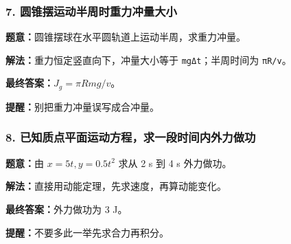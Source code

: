 \documentclass[12pt,a4paper]{ctexart}
\begin{document}
\subsubsection*{7. 圆锥摆运动半周时重力冲量大小}
\begin{tcolorbox}[colback=gray!2!white,colframe=black!60,title={题目}]
\textbf{题意：}圆锥摆球在水平圆轨道上运动半周，求重力冲量。\par
\end{tcolorbox}
\begin{tcolorbox}[colback=blue!2!white,colframe=blue!55!black,title={完整答案}]
\textbf{解法：}重力恒定竖直向下，冲量大小等于 \texttt{mgΔt}；半周时间为 \texttt{πR/v}。\par
\textbf{最终答案：}\(J_g=πRmg/v\)。\par

\end{tcolorbox}
\begin{tcolorbox}[colback=red!2!white,colframe=red!55!black,title={易错点}]
\textbf{提醒：}别把重力冲量误写成合冲量。\par
\end{tcolorbox}

\subsubsection*{8. 已知质点平面运动方程，求一段时间内外力做功}
\begin{tcolorbox}[colback=gray!2!white,colframe=black!60,title={题目}]
\textbf{题意：}由 \(x=5t, y=0.5t^2\) 求从 2 s 到 4 s 外力做功。\par
\end{tcolorbox}
\begin{tcolorbox}[colback=blue!2!white,colframe=blue!55!black,title={完整答案}]
\textbf{解法：}直接用动能定理，先求速度，再算动能变化。\par
\textbf{最终答案：}外力做功为 3 J。\par

\end{tcolorbox}
\begin{tcolorbox}[colback=red!2!white,colframe=red!55!black,title={易错点}]
\textbf{提醒：}不要多此一举先求合力再积分。\par
\end{tcolorbox}
\end{document}
